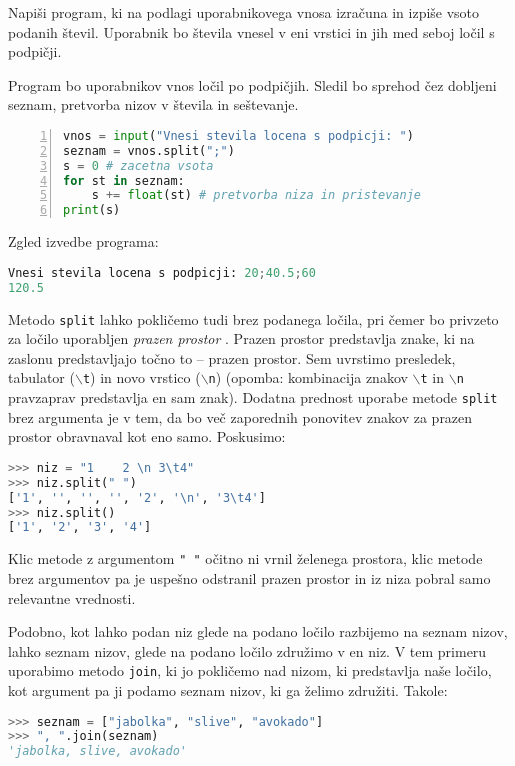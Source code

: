 \begin{zgled}
Napiši program, ki na podlagi uporabnikovega vnosa izračuna in izpiše vsoto podanih števil. Uporabnik bo števila vnesel v eni vrstici in jih med seboj ločil s podpičji. 
\end{zgled}
\begin{resitev}
Program bo uporabnikov vnos ločil po podpičjih. Sledil bo sprehod čez dobljeni seznam, pretvorba nizov v števila in seštevanje.
\begin{lstlisting}[language=Python, showstringspaces=false,numbers=left]
vnos = input("Vnesi stevila locena s podpicji: ")
seznam = vnos.split(";")
s = 0 # zacetna vsota
for st in seznam:
    s += float(st) # pretvorba niza in pristevanje
print(s)
\end{lstlisting}
Zgled izvedbe programa:
\begin{lstlisting}[language=Python, showstringspaces=false]
Vnesi stevila locena s podpicji: 20;40.5;60
120.5
\end{lstlisting}
\end{resitev}

Metodo \texttt{split} lahko pokličemo tudi brez podanega ločila, pri čemer bo privzeto za ločilo uporabljen \emph{prazen prostor} . Prazen prostor predstavlja znake, ki na zaslonu predstavljajo točno to -- prazen prostor. Sem uvrstimo presledek, tabulator (\texttt{$\backslash$t}) in novo vrstico (\texttt{$\backslash$n}) (opomba: kombinacija znakov \texttt{$\backslash$t} in \texttt{$\backslash$n} pravzaprav predstavlja en sam znak). Dodatna prednost uporabe metode \texttt{split} brez argumenta je v tem, da bo več zaporednih ponovitev znakov za prazen prostor obravnaval kot eno samo. Poskusimo:
\begin{lstlisting}[language=Python, showstringspaces=false]
>>> niz = "1    2 \n 3\t4"
>>> niz.split(" ")
['1', '', '', '', '2', '\n', '3\t4']
>>> niz.split()
['1', '2', '3', '4']
\end{lstlisting}
Klic metode z argumentom \texttt{" "} očitno ni vrnil želenega prostora, klic metode brez argumentov pa je uspešno odstranil prazen prostor in iz niza pobral samo relevantne vrednosti. 

Podobno, kot lahko podan niz glede na podano ločilo razbijemo na seznam nizov, lahko seznam nizov, glede na podano ločilo združimo v en niz. V tem primeru uporabimo metodo \texttt{join}, ki jo pokličemo nad nizom, ki predstavlja naše ločilo, kot argument pa ji podamo seznam nizov, ki ga želimo združiti. Takole: 
\begin{lstlisting}[language=Python, showstringspaces=false]
>>> seznam = ["jabolka", "slive", "avokado"]
>>> ", ".join(seznam)
'jabolka, slive, avokado'
\end{lstlisting}


